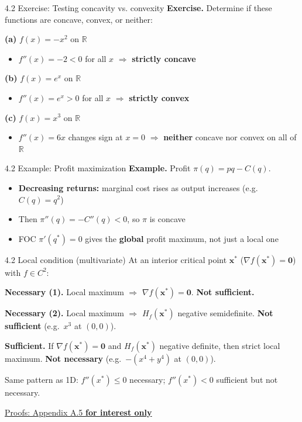 \documentclass[11pt,aspectratio=169]{beamer}
\newcommand{\QFrame}[1]{\begin{frame}{#1 \quad {\small\textcolor{mAccent}{Together}}}}
\newcommand{\InterestOnly}{\textcolor{mAccent}{\textbf{for interest only}}}
\begin{document}
\QFrame{4.2 Exercise: Testing concavity vs. convexity}
  \small
  \textbf{Exercise.} Determine if these functions are concave, convex, or neither:
  
  \textbf{(a)} $f(x) = -x^2$ on $\mathbb{R}$
  
  \begin{itemize}
    \item $f''(x) = -2 < 0$ for all $x$ $\Rightarrow$ \textbf{strictly concave}
  \end{itemize}
  
  \textbf{(b)} $f(x) = e^x$ on $\mathbb{R}$
  
  \begin{itemize}
    \item $f''(x) = e^x > 0$ for all $x$ $\Rightarrow$ \textbf{strictly convex}
  \end{itemize}
  
  \textbf{(c)} $f(x) = x^3$ on $\mathbb{R}$
  
  \begin{itemize}
    \item $f''(x) = 6x$ changes sign at $x = 0$ $\Rightarrow$ \textbf{neither} concave nor convex on all of $\mathbb{R}$
  \end{itemize}
\end{frame}

\begin{frame}{4.2 Example: Profit maximization}
  \small
  \textbf{Example.} Profit $\pi(q)=pq-C(q)$.
  
  \begin{itemize}
    \item \textbf{Decreasing returns:} marginal cost rises as output increases (e.g.\ $C(q)=q^2$)
    
    \item Then $\pi''(q)=-C''(q)<0$, so $\pi$ is concave
    
    \item FOC $\pi'(q^*)=0$ gives the \textbf{global} profit maximum, not just a local one
  \end{itemize}
\end{frame}

\begin{frame}{4.2 Local condition (multivariate)}
  \small
  At an interior critical point $\mathbf{x}^*$ ($\nabla f(\mathbf{x}^*)=\mathbf{0}$) with $f \in C^2$:
  
  \textbf{Necessary (1).} Local maximum $\Rightarrow$ $\nabla f(\mathbf{x}^*)=\mathbf{0}$. \textbf{Not sufficient.}
  
  \textbf{Necessary (2).} Local maximum $\Rightarrow$ $H_f(\mathbf{x}^*)$ negative semidefinite. \textbf{Not sufficient} (e.g.\ $x^3$ at $(0,0)$).
  
  \textbf{Sufficient.} If $\nabla f(\mathbf{x}^*)=\mathbf{0}$ and $H_f(\mathbf{x}^*)$ negative definite, then strict local maximum. \textbf{Not necessary} (e.g.\ $-(x^4+y^4)$ at $(0,0)$).
  
  Same pattern as 1D: $f''(x^*)\leq 0$ necessary; $f''(x^*)<0$ sufficient but not necessary.
  
  \hfill\hyperlink{appendix:multivariate_soc}{\scriptsize Proofs: Appendix A.5 \InterestOnly}
\end{frame}
\end{document}
